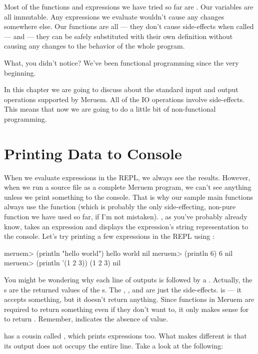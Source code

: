 Most of the functions and expressions we have tried so far are . Our variables are all immutable. Any expressions we evaluate wouldn't cause any changes somewhere else. Our functions are all  --- they don't cause side-effects when called --- and  --- they can be safely substituted with their own definition without causing any changes to the behavior of the whole program. 

What, you didn't notice? We've been functional programming since the very beginning.

In this chapter we are going to discuss about the standard input and output operations supported by Meruem. All of the IO operations involve side-effects. This means that now we are going to do a little bit of non-functional programming.

\section{Printing Data to Console}
When we evaluate expressions in the REPL, we always see the results. However, when we run a source file as a complete Meruem program, we can't see anything unless we print something to the console. That is why our sample main functions always use the  function (which is probably the only side-effecting, non-pure function we have used so far, if I'm not mistaken). , as you've probably already know, takes an expression and displays the expression's string representation to the console. Let's try printing a few expressions in the REPL using :

\begin{REPL}
meruem> (println "hello world")
hello world
nil
meruem> (println 6)
6
nil
meruem> (println '(1 2 3))
(1 2 3)
nil
\end{REPL}

You might be wondering why each line of outputs is followed by a . Actually, the s are the returned values of the s. The , , and  are just the side-effects.  is  --- it accepts something, but it doesn't return anything. Since functions in Meruem are required to return something even if they don't want to, it only makes sense for  to return . Remember,  indicates the absence of value.

 has a cousin called , which prints expressions too. What makes  different is that its output does not occupy the entire line. Take a look at the following:

